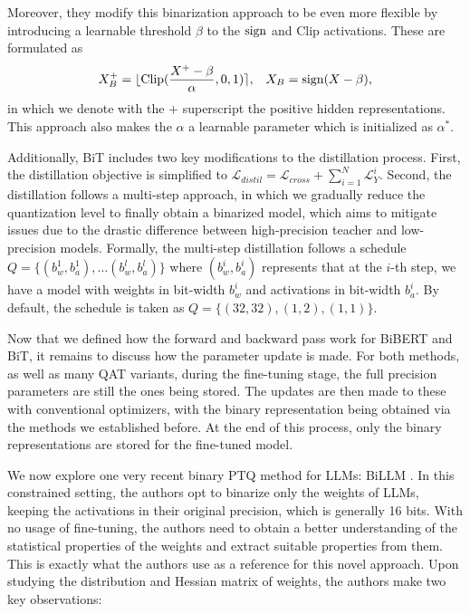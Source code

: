 Moreover, they modify this binarization approach to be even more flexible by introducing a learnable threshold $\beta$ to the $\text{sign}$ and $\text{Clip}$ activations. These are formulated as
\begin{equation}
    X_B^+ = \lfloor \text{Clip}( \frac{X^+ - \beta}{\alpha}, 0, 1) \rceil, \;\;\; X_B = \text{sign}(X - \beta),
\end{equation}
in which we denote with the $+$ superscript the positive hidden representations. This approach also makes the $\alpha$ a learnable parameter which is initialized as $\alpha^*$.

Additionally, BiT includes two key modifications to the distillation process. First, the distillation objective is simplified to $\mathcal{L}_{distil} = \mathcal{L}_{cross} + \sum_{i=1}^N \mathcal{L}^i_{Y}$. Second, the distillation follows a multi-step approach, in which we gradually reduce the quantization level to finally obtain a binarized model, which aims to mitigate issues due to the drastic difference between high-precision teacher and low-precision models. Formally, the multi-step distillation follows a schedule $Q = \{ (b^1_w, b_a^1), \ldots (b^l_w, b^l_a) \}$ where $(b^i_w, b^i_a)$ represents that at the $i$-th step, we have a model with weights in bit-width $b^i_w$ and activations in bit-width $b^i_a$. By default, the schedule is taken as $Q = \{(32, 32), (1, 2), (1, 1)\}$.

\vspace{1em}

Now that we defined how the forward and backward pass work for BiBERT and BiT, it remains to discuss how the parameter update is made. For both methods, as well as many QAT variants, during the fine-tuning stage, the full precision parameters are still the ones being stored. The updates are then made to these with conventional optimizers, with the binary representation being obtained via the methods we established before. At the end of this process, only the binary representations are stored for the fine-tuned model.


\vspace{1em}

We now explore one very recent binary PTQ method for LLMs: BiLLM \cite{huang2024billm}. In this constrained setting, the authors opt to binarize only the weights of LLMs, keeping the activations in their original precision, which is generally 16 bits.
With no usage of fine-tuning, the authors need to obtain a better understanding of the statistical properties of the weights and extract suitable properties from them. 
This is exactly what the authors use as a reference for this novel approach. Upon studying the distribution and Hessian matrix of weights, the authors make two key observations: 

